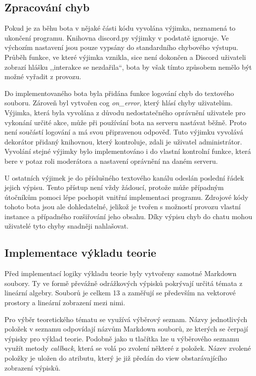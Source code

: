 \documentclass[FM]{tulthesis}
\begin{document}
	\subsection{Zpracování chyb}
	
	Pokud je za běhu bota v nějaké části kódu vyvolána výjimka, neznamená to ukončení programu. Knihovna discord.py výjimky v podstatě ignoruje. Ve výchozím nastavení jsou pouze vypsány do standardního chybového výstupu. Průběh funkce, ve které výjimka vznikla, sice není dokončen a Discord uživateli zobrazí hlášku ,,interakce se nezdařila``, bota by však tímto způsobem nemělo být možné vyřadit z provozu.
	
	Do implementovaného bota byla přidána funkce logování chyb do textového souboru. Zároveň byl vytvořen cog \textit{on\_error}, který hlásí chyby uživatelům. Výjimka, která byla vyvolána z důvodu nedostatečného oprávnění uživatele pro vykonání určité akce, může při používání bota na serveru nastávat běžně. Proto není součástí logování a má svou připravenou odpověď. Tuto výjimku vyvolává dekorátor přidaný knihovnou, který kontroluje, zdali je uživatel administrátor. Vyvolání stejné \mbox{výjimky} bylo implementováno i do vlastní kontrolní funkce, která bere v potaz roli moderátora a nastavení oprávnění na daném serveru.
	
	U ostatních výjimek je do příslušného textového kanálu odeslán poslední řádek jejich výpisu. Tento přístup není vždy žádoucí, protože může případným útočníkům pomoci lépe pochopit vnitřní implementaci programu. Zdrojové kódy tohoto bota jsou ale dohledatelné, jelikož je tvořen s možností provozu vlastní instance a případného rozšiřování jeho obsahu. Díky výpisu chyb do chatu mohou uživatelé tyto chyby snadněji nahlašovat.
		
	\subsection{Implementace výkladu teorie}

	Před implementací logiky výkladu teorie byly vytvořeny samotné Markdown soubory. Ty ve formě převážně odrážkových výpisků pokrývají určitá témata z \mbox{lineární} algebry. Souborů je celkem 13 a zaměřují se především na vektorové prostory a lineární zobrazení mezi nimi.

	Pro výběr teoretického tématu se využívá výběrový seznam. Názvy jednotlivých položek v seznamu odpovídají názvům Markdown souborů, ze kterých se čerpají výpisky pro výklad teorie. Podobně jako u tlačítka lze u výběrového seznamu využít metody \textit{callback}, která se volá po zvolení některé z položek. Název zvolené položky je uložen do atributu, který je již předán do view obstarávajícího zobrazení výpisků.%
	
\end{document}
